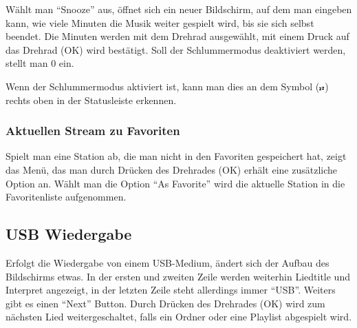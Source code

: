 \documentclass[12pt,a4paper,openany]{memoir}
\begin{document}
Wählt man ``Snooze'' aus, öffnet sich ein neuer Bildschirm, auf dem man eingeben kann, wie viele Minuten die Musik weiter gespielt wird, bis sie sich selbst beendet. 
Die Minuten werden mit dem Drehrad ausgewählt, mit einem Druck auf das Drehrad (OK) wird bestätigt. Soll der Schlummermodus deaktiviert werden, stellt man 0 ein. 


Wenn der Schlummermodus aktiviert ist, kann man dies an dem Symbol (\includegraphics[width=8px]{images/snooze_symbol.png}) rechts oben in der Statusleiste erkennen.



\subsubsection{Aktuellen Stream zu Favoriten}
Spielt man eine Station ab, die man nicht in den Favoriten gespeichert hat, zeigt das Menü, das man durch Drücken des Drehrades (OK) erhält eine zusätzliche Option an. 
Wählt man die Option ``As Favorite'' wird die aktuelle Station in die Favoritenliste aufgenommen. 


\subsection{USB Wiedergabe}

Erfolgt die Wiedergabe von einem USB-Medium, ändert sich der Aufbau des Bildschirms etwas. In der ersten und zweiten Zeile werden weiterhin Liedtitle und Interpret angezeigt, in der letzten Zeile 
steht allerdings immer ``USB''. Weiters gibt es einen ``Next'' Button. Durch Drücken des Drehrades (OK) wird zum nächsten Lied weitergeschaltet, falls ein Ordner oder eine Playlist abgespielt wird. 
\end{document}
